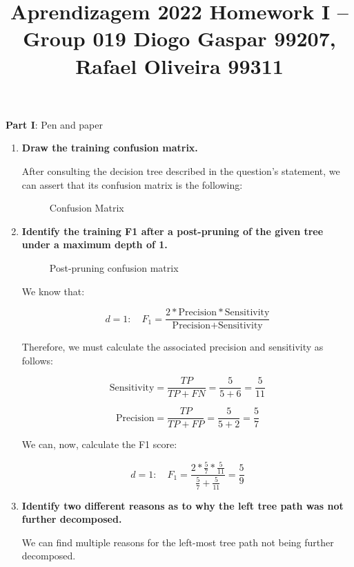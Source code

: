 \documentclass[12pt]{article}
\title{\large{Aprendizagem 2022}\vskip 0.2cm Homework I -- Group 019\vskip 0.2cm Diogo Gaspar 99207, Rafael Oliveira 99311}
\date{}
\begin{document}
\maketitle
\center\large{\vskip -2.5cm\textbf{Part I}: Pen and paper}
\begin{enumerate}[leftmargin=\labelsep]
  \item \textbf{Draw the training confusion matrix.}

        After consulting the decision tree described in the question's statement,
        we can assert that its confusion matrix is the following:

        \begin{figure}[htpb]
          \centering
          
          \caption{Confusion Matrix}
        \end{figure}

  \item \textbf{Identify the training F1 after a post-pruning of the given tree under a maximum depth of 1.}

        \begin{figure}[htpb]
          \centering
          
          \caption{Post-pruning confusion matrix}
        \end{figure}

        We know that:

        $$
          d = 1: \quad F_1 = \frac{2 * \text{Precision} * \text{Sensitivity}}{\text{Precision} + \text{Sensitivity}}
        $$

        Therefore, we must calculate the associated precision and sensitivity as follows:

        $$
          \text{Sensitivity} = \frac{TP}{TP + FN} = \frac{5}{5 + 6} = \frac{5}{11}
        $$

        $$
          \text{Precision} = \frac{TP}{TP + FP}= \frac{5}{5 + 2} = \frac{5}{7}
        $$

        We can, now, calculate the F1 score:

        $$
          d = 1: \quad F_1 = \frac{2 * \frac{5}{7} * \frac{5}{11}}{\frac{5}{7} + \frac{5}{11}} = \frac{5}{9}
        $$

  \item \textbf{Identify two different reasons as to why the left tree path was not further decomposed.}

        We can find multiple reasons for the left-most tree path not being further decomposed.


\end{enumerate}
\end{document}
